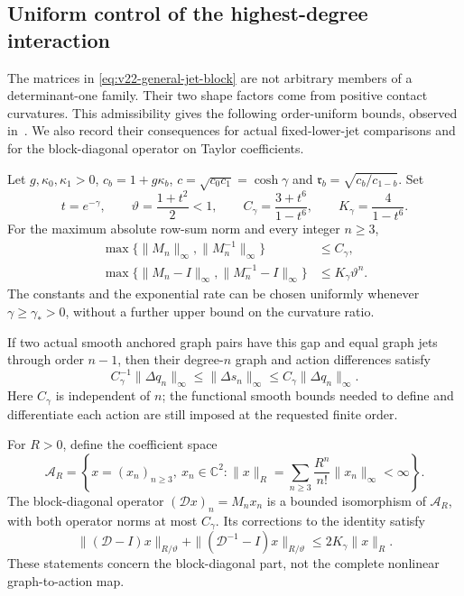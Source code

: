 \subsection{Uniform control of the highest-degree interaction}

The matrices in \eqref{eq:v22-general-jet-block} are not arbitrary
members of a determinant-one family.  Their two shape factors come from
positive contact curvatures.  This admissibility gives the following
order-uniform bounds, observed in~\cite{A2ReviewV57}.  We also record
their consequences for actual fixed-lower-jet comparisons and for the
block-diagonal operator on Taylor coefficients.

\begin{proposition}
\label{prop:v58-uniform-blocks}
Let $g,\kappa_0,\kappa_1>0$, $c_b=1+g\kappa_b$,
$c=\sqrt{c_0c_1}=\cosh\gamma$ and
$\mathfrak r_b=\sqrt{c_b/c_{1-b}}$.  Set
\begin{equation}\label{eq:v58-block-constants}
 t=e^{-\gamma},\qquad \vartheta=\frac{1+t^2}{2}<1,\qquad
 C_\gamma=\frac{3+t^6}{1-t^6},\qquad K_\gamma=\frac4{1-t^6}.
\end{equation}
For the maximum absolute row-sum norm and every integer $n\ge3$,
\begin{align}
 \max\{\|M_n\|_\infty,\|M_n^{-1}\|_\infty\}&\le C_\gamma,
                                      \label{eq:v58-uniform-block-bound}\\
 \max\{\|M_n-I\|_\infty,\|M_n^{-1}-I\|_\infty\}
                                  &\le K_\gamma\vartheta^n.
                                      \label{eq:v58-identity-decay}
\end{align}
The constants and the exponential rate can be chosen uniformly whenever
$\gamma\ge\gamma_*>0$, without a further upper bound on the curvature
ratio.

If two actual smooth anchored graph pairs have this gap and equal graph
jets through order $n-1$, then their degree-$n$ graph and action differences
satisfy
\begin{equation}\label{eq:v58-actual-top-degree}
 C_\gamma^{-1}\|\Delta q_n\|_\infty
       \le \|\Delta s_n\|_\infty
       \le C_\gamma\|\Delta q_n\|_\infty.
\end{equation}
Here $C_\gamma$ is independent of $n$; the functional smooth bounds needed
to define and differentiate each action are still imposed at the requested
finite order.

For $R>0$, define the coefficient space
\[
 \mathcal A_R=\left\{x=(x_n)_{n\ge3},\ x_n\in\mathbb C^2:
       \|x\|_R=\sum_{n\ge3}\frac{R^n}{n!}\|x_n\|_\infty<\infty\right\}.
\]
The block-diagonal operator $(\mathcal D x)_n=M_nx_n$ is a bounded
isomorphism of $\mathcal A_R$, with both operator norms at most
$C_\gamma$.  Its corrections to the identity satisfy
\begin{equation}\label{eq:v58-coefficient-radius}
 \| (\mathcal D-I)x\|_{R/\vartheta}
 +\| (\mathcal D^{-1}-I)x\|_{R/\vartheta}
                            \le 2K_\gamma\|x\|_R.
\end{equation}
These statements concern the block-diagonal part, not the complete
nonlinear graph-to-action map.
\end{proposition}

